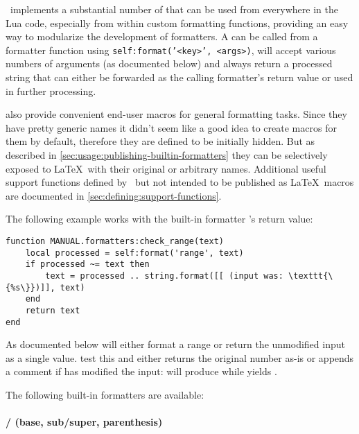 \documentclass[12pt]{scrartcl}
\begin{document}
\luaformatters\ implements a substantial number of  that can be used from everywhere in the Lua
code, especially from within custom formatting functions, providing an easy way
to modularize the development of formatters.  A  can be
called from a formatter function using \texttt{self:format('<key>',
<args>)}, will accept various numbers of arguments (as documented below) and
always return a processed string that can either be forwarded as the calling
formatter's return value or used in further processing.

 also provide convenient end-user
macros for general formatting tasks.  Since they have pretty generic names it
didn't seem like a good idea to create macros for them by default, therefore
they are defined to be initially hidden.  But as described in
\vref{sec:usage:publishing-builtin-formatters} they can be selectively exposed
to \LaTeX\ with their original or arbitrary names.  Additional useful support
functions defined by \luaformatters\ but not intended to be published as \LaTeX\
macros are documented in \vref{sec:defining:support-functions}.

The following example works with the built-in formatter 's return value:

\begin{verbatim}
function MANUAL.formatters:check_range(text)
    local processed = self:format('range', text)
    if processed ~= text then
        text = processed .. string.format([[ (input was: \texttt{\{%s\}})]], text)
    end
    return text
end
\end{verbatim}

\noindent As documented below  will either format a range or
return the unmodified input as a single value.  \cmd{checkRange} test this and
either returns the original number as-is or appends a comment if \luavar{range}
has modified the input: \texttt{} will produce
\checkRange{5} while \texttt{} yields .


\medskip

\noindent
The following built-in formatters are available:

\paragraph{ /  (base, sub/super, parenthesis)}
\end{document}
